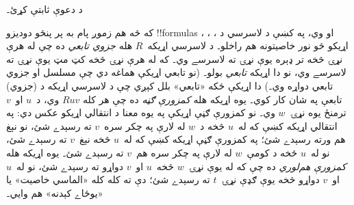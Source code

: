 \documentclass[../../../include/open-logic-section]{subfiles}
\begin{document}
\begin{prob}
  د  دعوې ثابتې کړئ۔
\end{prob}

که څه هم زموږ پام به پر پنځو دوديزو !!{formula}s ،
، ،  او  وي، په
 کښې د لاسرسي د اړيکو څو نور خاصيتونه هم
راخلو۔ د لاسرسي اړيکه~$R$ هله \emph{جزوي تابعي} ده چې له هرې نړۍ
څخه تر ډېره يوې نړۍ ته لاسرسے وي۔ که له هرې نړۍ څخه کټ مټ يوې نړۍ
ته لاسرسے وي، نو دا اړيکه \emph{تابعي} بولو۔ (نو تابعي اړيکې هماغه
دي چې مسلسل او جزوي تابعي دواړه وي۔) دا اړيکې ځکه «تابعي» بلل
کېږي چې د لاسرسي اړيکه د (جزوي) تابعې په شان کار کوي۔ يوه اړيکه
هله \emph{کمزورې ګڼه} ده چې هر کله $Ruv$ وي، د~$u$ او~$v$ ترمنځ
يوه نړۍ~$w$ وي۔ نو کمزورې ګڼې اړيکې په يوه معنا د انتقالي اړيکو
عکس دي: په انتقالي اړيکه کښې که له~$u$ څخه د~$w$ له لارې په چکر
سره~$v$ ته رسېدے شئ، نو نېغ هم ورته رسېدے شئ؛ په کمزورې ګڼې
اړيکه کښې که له~$u$ څخه نېغ~$v$ ته رسېدے شئ، نو له~$u$ څخه
د کومې~$w$ له لارې په چکر سره هم~$v$ ته رسېدے شئ۔ يوه اړيکه هله
\emph{کمزورې هم‌لوري} ده چې که له يوې نړۍ~$w$ څخه~$u$ او~$v$
دواړو ته رسېدے شئ، نو له~$u$ او~$v$ دواړو څخه يوې ګډې نړۍ~$t$
ته رسېدے شئ؛ دې ته کله کله «الماسي خاصيت» يا «يوځاے کېدنه» هم
وايي۔
\end{document}
